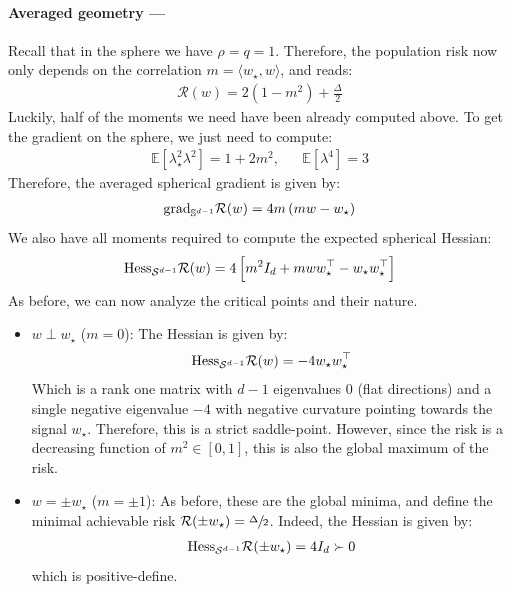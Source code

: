 \paragraph{Averaged geometry ---} Recall that in the sphere we have $\rho=q=1$. Therefore, the population risk now only depends on the correlation $m=\langle w_{\star}, w\rangle$, and reads:
\begin{align}
    \mathcal{R}(w) = 2(1-m^2)+\frac{\Delta}{2}
\end{align}
Luckily, half of the moments we need have been already computed above. To get the gradient on the sphere, we just need to compute: 
\begin{align}
    \mathbb{E}[\lambda_{\star}^2\lambda^2] = 1+2m^2, && \mathbb{E}[\lambda^4] = 3
\end{align}
Therefore, the averaged spherical gradient is given by:
\begin{align}
   {\rm grad}_{\mathbb{S}^{d-1}}\mathcal{R}(w) = 4m\left(m w-w_{\star}\right)
\end{align}
We also have all moments required to compute the expected spherical Hessian:
\begin{align}
 {\rm Hess}_{\mathcal{S}^{d-1}}\mathcal{R}(w) = 4\left[m^2 I_{d}+m w w_{\star}^{\top}-w_{\star}w_{\star}^{\top}\right]
\end{align}
As before, we can now analyze the critical points and their nature.
\begin{itemize}
    \item $w\perp w_{\star}$ ($m=0$): The Hessian is given by: 
    \begin{align}
        {\rm Hess}_{\mathcal{S}^{d-1}}\mathcal{R}(w) = -4w_{\star}w_{\star}^{\top}
    \end{align}
    Which is a rank one matrix with $d-1$ eigenvalues $0$ (flat directions) and a single negative eigenvalue $-4$ with negative curvature pointing towards the signal $w_{\star}$. Therefore, this is a strict saddle-point. However, since the risk is a decreasing function of $m^2 \in [0,1]$, this is also the global maximum of the risk.
    
    \item $w=\pm w_{\star}$ ($m=\pm 1$): As before, these are the global minima, and define the minimal achievable risk $\mathcal{R}(\pm w_{\star}) = \sfrac{\Delta}{2}$. Indeed, the Hessian is given by:
    \begin{align}
        {\rm Hess}_{\mathcal{S}^{d-1}}\mathcal{R}(\pm w_{\star}) = 4 I_{d}\succ 0
    \end{align}
   which is positive-define.
\end{itemize}
